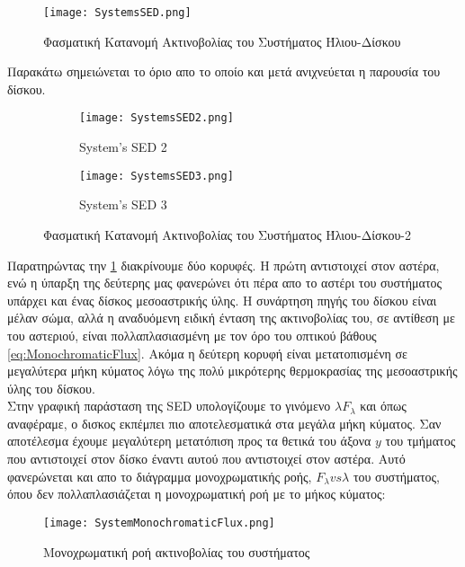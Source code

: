 \begin{figure}[h]
\centering
  \texttt{[image: SystemsSED.png]}
\caption{Φασματική Κατανομή Ακτινοβολίας του Συστήματος Ήλιου-Δίσκου}\label{fig:SystemSED1}
\end{figure}

Παρακάτω σημειώνεται το όριο απο το οποίο και μετά ανιχνεύεται η παρουσία του δίσκου.


\begin{figure}[h]
\centering
 \begin{subfigure}{0.48\textwidth}
  \centering
  \texttt{[image: SystemsSED2.png]}
  \caption{{\en System's SED 2}}\label{fig:SystemSED2}
 \end{subfigure}\hfill
 \begin{subfigure}{0.48\textwidth}
  \centering
  \texttt{[image: SystemsSED3.png]}
  \caption{{\en System's SED 3}}\label{fig:SystemSED3}
 \end{subfigure}
  \caption{Φασματική Κατανομή Ακτινοβολίας του Συστήματος Ήλιου-Δίσκου-2}
\end{figure}


Παρατηρώντας την \ref{fig:SystemSED1} διακρίνουμε δύο κορυφές. Η πρώτη αντιστοιχεί στον αστέρα, ενώ η ύπαρξη της δεύτερης μας φανερώνει ότι πέρα απο το αστέρι του συστήματος υπάρχει και ένας δίσκος μεσοαστρικής ύλης. Η συνάρτηση πηγής του δίσκου είναι μέλαν σώμα, αλλά η αναδυόμενη ειδική ένταση της ακτινοβολίας του, σε αντίθεση με του αστεριού, είναι πολλαπλασιασμένη με τον όρο του οπτικού βάθους \ref{eq:MonochromaticFlux}. Ακόμα η δεύτερη κορυφή είναι μετατοπισμένη σε μεγαλύτερα μήκη κύματος λόγω της πολύ μικρότερης θερμοκρασίας της μεσοαστρικής ύλης του δίσκου.\\

Στην γραφική παράσταση της {\en SED} υπολογίζουμε το γινόμενο $\lambda F_{\lambda}$ και όπως αναφέραμε, ο δισκος εκπέμπει πιο αποτελεσματικά στα μεγάλα μήκη κύματος. Σαν αποτέλεσμα έχουμε μεγαλύτερη μετατόπιση προς τα θετικά του άξονα $y$ του τμήματος που αντιστοιχεί στον δίσκο έναντι αυτού που αντιστοιχεί στον αστέρα. Αυτό φανερώνεται και απο το διάγραμμα μονοχρωματικής ροής, $F_{\lambda} vs \lambda$ του συστήματος, όπου δεν πολλαπλασιάζεται η μονοχρωματική ροή με το μήκος κύματος:

\begin{figure}[h]
\centering
  \texttt{[image: SystemMonochromaticFlux.png]}
\caption{Μονοχρωματική ροή ακτινοβολίας του συστήματος}\label{fig:SystemMonochromaticFlux}
\end{figure}


